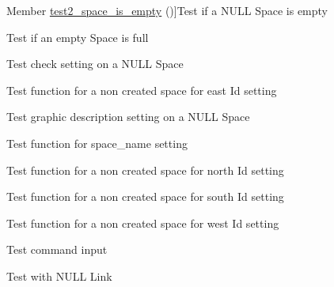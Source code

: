 \begin{DoxyRefList}
\hypertarget{test__test000248}{}%
Member \hyperlink{space__test_8h_ab37dd2227cdf35c7cf00b5cfc5f15cc9}{test2\+\_\+space\+\_\+is\+\_\+empty} ()]Test if a N\+U\+LL Space is empty  
\item[\label{test__test000251}%
\hypertarget{test__test000251}{}%
Member \hyperlink{space__test_8h_a58fa377888060f04809b114577dddd8e}{test2\+\_\+space\+\_\+is\+\_\+full} ()]Test if an empty Space is full  
\item[\label{test__test000221}%
\hypertarget{test__test000221}{}%
Member \hyperlink{space__test_8h_a48cfb4cb3e2f0c84402036a2be982a6b}{test2\+\_\+space\+\_\+set\+\_\+check} ()]Test check setting on a N\+U\+LL Space  
\item[\label{test__test000214}%
\hypertarget{test__test000214}{}%
Member \hyperlink{space__test_8h_a5df66d103388be4518c379b224f53770}{test2\+\_\+space\+\_\+set\+\_\+east} ()]Test function for a non created space for east Id setting  
\item[\label{test__test000218}%
\hypertarget{test__test000218}{}%
Member \hyperlink{space__test_8h_aff1a4a8818b4f4bfcfd65c2f04cd060a}{test2\+\_\+space\+\_\+set\+\_\+graphic\+\_\+description} ()]Test graphic description setting on a N\+U\+LL Space  
\item[\label{test__test000207}%
\hypertarget{test__test000207}{}%
Member \hyperlink{space__test_8h_a5a868ba017602ba6b58447cb394e81a6}{test2\+\_\+space\+\_\+set\+\_\+name} ()]Test function for space\+\_\+name setting  
\item[\label{test__test000210}%
\hypertarget{test__test000210}{}%
Member \hyperlink{space__test_8h_a3bc7fe26c1e36ffd195099a9983206e1}{test2\+\_\+space\+\_\+set\+\_\+north} ()]Test function for a non created space for north Id setting  
\item[\label{test__test000212}%
\hypertarget{test__test000212}{}%
Member \hyperlink{space__test_8h_ac9f950741f12ccfcc5ad5d9e71d3d90a}{test2\+\_\+space\+\_\+set\+\_\+south} ()]Test function for a non created space for south Id setting  
\item[\label{test__test000216}%
\hypertarget{test__test000216}{}%
Member \hyperlink{space__test_8h_aa51b05ffd99b7bbd8f2dfc23c8f85870}{test2\+\_\+space\+\_\+set\+\_\+west} ()]Test function for a non created space for west Id setting  
\item[\label{test__test000006}%
\hypertarget{test__test000006}{}%
Member \hyperlink{command__test_8h_ae2d4b758fa9767317795c822b7334dec}{test3\+\_\+command\+\_\+get\+\_\+user\+\_\+input} ()]Test command input  
\item[\label{test__test000087}%
\hypertarget{test__test000087}{}%
Member \hyperlink{game__test_8h_af97f3fbab50d8122acc5b2632c9a27cb}{test3\+\_\+game\+\_\+add\+\_\+link} ()]Test with N\+U\+LL Link 


\end{DoxyRefList}
